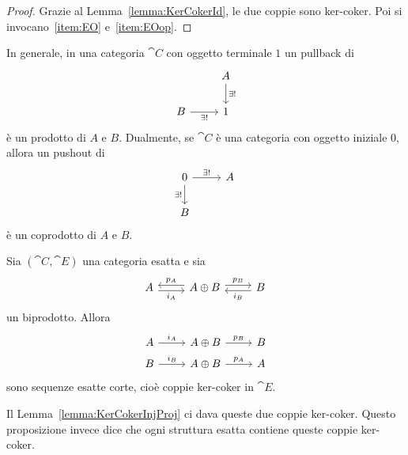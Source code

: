 \begin{proof}
  Grazie al Lemma~\ref{lemma:KerCokerId}, le due coppie sono
  ker-coker. Poi si invocano~\ref{item:EO} e~\ref{item:EOop}.
\end{proof}

\begin{recall}
  In generale, in una categoria \(\cat C\) con oggetto terminale \(1\)
  un pullback di
  \[
    \begin{tikzcd}
      & A \ar["{\exists!}",d] \\
      B \ar["{\exists!}", r, swap] & 1
    \end{tikzcd}
  \]
  è un prodotto di \(A\) e \(B\). Dualmente, se \(\cat C\) è una
  categoria con oggetto iniziale \(0\), allora un pushout di
  \[
    \begin{tikzcd}
      0 \ar["{\exists!}",r] \ar["{\exists!}", d, swap]  & A \\
      B
    \end{tikzcd}
  \]
  è un coprodotto di \(A\) e \(B\).
\end{recall}

\begin{proposition}\label{proposition:ExactInjProj}
  Sia \((\cat C,\cat E)\) una categoria esatta e sia
  \[
    \begin{tikzcd}
      A \ar["{i_A}", r, shift right, swap] & A \oplus B \ar["{p_A}", l,
      shift right, swap] \ar["{p_B}", r, shift left] & B \ar["{i_B}", l,
      shift left]
    \end{tikzcd}
  \]
  un biprodotto. Allora
  \[
    \begin{tikzcd}[row sep=tiny]
      A \ar["{i_A}", r] & A \oplus B \ar["{p_B}", r] & B \\
      B \ar["{i_B}", r] & A \oplus B \ar["{p_A}", r] & A
    \end{tikzcd}
  \]
  sono sequenze esatte corte, cioè coppie ker-coker in \(\cat E\).
\end{proposition}

Il Lemma~\ref{lemma:KerCokerInjProj} ci dava queste due coppie
ker-coker. Questo proposizione invece dice che ogni struttura esatta
contiene queste coppie ker-coker.


